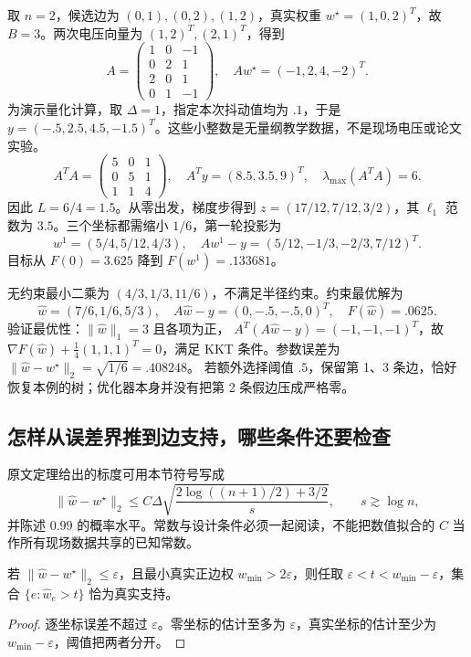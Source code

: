 \begin{example}[有量化偏移的稀疏回归]
取 $n=2$，候选边为 $(0,1),(0,2),(1,2)$，真实权重
$w^\star=(1,0,2)^T$，故 $B=3$。两次电压向量为 $(1,2)^T,(2,1)^T$，得到
\[
 A=\begin{pmatrix}1&0&-1\\0&2&1\\2&0&1\\0&1&-1\end{pmatrix},\quad
 Aw^\star=(-1,2,4,-2)^T.
\]
为演示量化计算，取 $\Delta=1$，指定本次抖动值均为 $.1$，于是
$y=(-.5,2.5,4.5,-1.5)^T$。这些小整数是无量纲教学数据，不是现场电压或论文实验。
\[
 A^TA=\begin{pmatrix}5&0&1\\0&5&1\\1&1&4\end{pmatrix},\quad
 A^Ty=(8.5,3.5,9)^T,\quad \lambda_{\max}(A^TA)=6.
\]
因此 $L=6/4=1.5$。从零出发，梯度步得到
$z=(17/12,7/12,3/2)$，其 $\ell_1$ 范数为 $3.5$。三个坐标都需缩小 $1/6$，第一轮投影为
\[
 w^1=(5/4,5/12,4/3),\quad
 Aw^1-y=(5/12,-1/3,-2/3,7/12)^T.
\]
目标从 $F(0)=3.625$ 降到 $F(w^1)=.133681$。

无约束最小二乘为 $(4/3,1/3,11/6)$，不满足半径约束。约束最优解为
\[
 \hat w=(7/6,1/6,5/3),\quad A\hat w-y=(0,-.5,-.5,0)^T,
 \quad F(\hat w)=.0625.
\]
验证最优性：$\|\hat w\|_1=3$ 且各项为正，
$A^T(A\hat w-y)=(-1,-1,-1)^T$，故
$\nabla F(\hat w)+\tfrac14(1,1,1)^T=0$，满足 KKT 条件。参数误差为
$\|\hat w-w^\star\|_2=\sqrt{1/6}=.408248$。
若额外选择阈值 $.5$，保留第 1、3 条边，恰好恢复本例的树；优化器本身并没有把第 2 条假边压成严格零。
\end{example}

\subsection{怎样从误差界推到边支持，哪些条件还要检查}

原文定理给出的标度可用本节符号写成
\begin{equation}
 \|\hat w-w^\star\|_2\le
 C\Delta\sqrt{\frac{2\log((n+1)/2)+3/2}{s}},
 \qquad s\gtrsim\log n,
 \label{eq:dq_s7_rate}
\end{equation}
并陈述 $0.99$ 的概率水平。常数与设计条件必须一起阅读，不能把数值拟合的 $C$ 当作所有现场数据共享的已知常数。

\begin{proposition}
若 $\|\hat w-w^\star\|_2\le\varepsilon$，且最小真实正边权
$w_{\min}>2\varepsilon$，则任取
$\varepsilon<t<w_{\min}-\varepsilon$，集合
$\{e:\hat w_e>t\}$ 恰为真实支持。
\end{proposition}
\begin{proof}
逐坐标误差不超过 $\varepsilon$。零坐标的估计至多为 $\varepsilon$，真实坐标的估计至少为 $w_{\min}-\varepsilon$，阈值把两者分开。
\end{proof}

